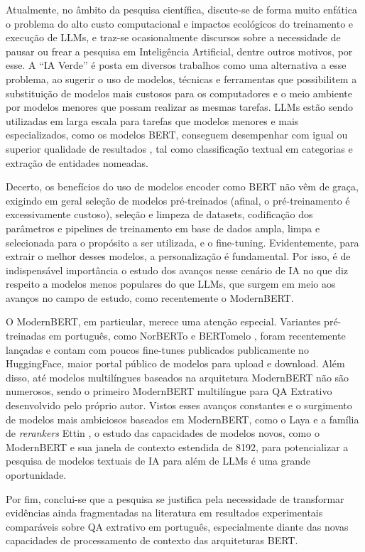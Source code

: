 \documentclass[12pt,a4paper]{article}
\begin{document}
Atualmente, no âmbito da pesquisa científica, discute-se de forma muito enfática o problema do alto custo computacional e impactos ecológicos do treinamento e execução de LLMs, e traz-se ocasionalmente discursos sobre a necessidade de pausar ou frear a pesquisa em Inteligência Artificial, dentre outros motivos, por esse. A ``IA Verde'' é posta em diversos trabalhos como uma alternativa a esse problema, ao sugerir o uso de modelos, técnicas e ferramentas que possibilitem a substituição de modelos mais custosos para os computadores e o meio ambiente por modelos menores que possam realizar as mesmas tarefas. LLMs estão sendo utilizadas em larga escala para tarefas que modelos menores e mais especializados, como os modelos BERT, conseguem desempenhar com igual ou superior qualidade de resultados \cite{deshpande}, tal como classificação textual em categorias e extração de entidades nomeadas.

Decerto, os benefícios do uso de modelos encoder como BERT não vêm de graça, exigindo em geral seleção de modelos pré-treinados (afinal, o pré-treinamento é excessivamente custoso), seleção e limpeza de datasets, codificação dos parâmetros e pipelines de treinamento em base de dados ampla, limpa e selecionada para o propósito a ser utilizada, e o fine-tuning. Evidentemente, para extrair o melhor desses modelos, a personalização é fundamental. Por isso, é de indispensável importância o estudo dos avanços nesse cenário de IA no que diz respeito a modelos menos populares do que LLMs, que surgem em meio aos avanços no campo de estudo, como recentemente o ModernBERT.

O ModernBERT, em particular, merece uma atenção especial. Variantes pré-treinadas em português, como NorBERTo \cite{norberto} e BERTomelo \cite{bertomelo}, foram recentemente lançadas e contam com poucos fine-tunes publicados publicamente no HuggingFace, maior portal público de modelos para upload e download. Além disso, até modelos multilíngues baseados na arquitetura ModernBERT não são numerosos, sendo o primeiro ModernBERT multilíngue para QA Extrativo desenvolvido pelo próprio autor. Vistos esses avanços constantes e o surgimento de modelos mais ambiciosos baseados em ModernBERT, como o Laya e a família de \textit{rerankers} Ettin \cite{ettin}, o estudo das capacidades de modelos novos, como o ModernBERT e sua janela de contexto estendida de 8192, para potencializar a pesquisa de modelos textuais de IA para além de LLMs é uma grande oportunidade.

Por fim, conclui-se que a pesquisa se justifica pela necessidade de transformar evidências ainda fragmentadas na literatura em resultados experimentais comparáveis sobre QA extrativo em português, especialmente diante das novas capacidades de processamento de contexto das arquiteturas BERT.
\end{document}
